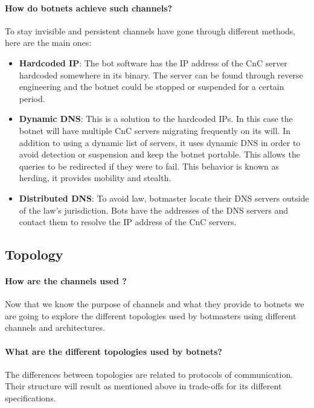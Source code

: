 \paragraph{How do botnets achieve such channels?}
To stay invisible and persistent channels have gone through different methods, here are the main ones: 
\begin{itemize}
\item \textbf{Hardcoded IP}: The bot software has the IP address of the CnC server hardcoded somewhere in its binary. The server can be found through reverse engineering and the botnet could be stopped or suspended for a certain period.
\item \textbf{Dynamic DNS}: This is a solution to the hardcoded IPs. In this case the botnet will have multiple CnC servers migrating frequently on its will. In addition to using a dynamic list of servers, it uses dynamic DNS in order to avoid detection or suspension and keep the botnet portable. This allows the queries to be redirected if they were to fail. This behavior is known as herding, it provides mobility and stealth.
\item \textbf{Distributed DNS}: To avoid law, botmaster locate their DNS servers outside of the law's jurisdiction. Bots have the addresses of the DNS servers and contact them to resolve the IP address of the CnC servers.
\end{itemize}

\subsection{Topology}
\paragraph{How are the channels used ?}
Now that we know the purpose of channels and what they provide to botnets we are going to explore the different topologies used by botmasters using different channels and architectures.
\paragraph{What are the different topologies used by botnets?}
The differences between topologies are related to protocols of communication. Their structure will result as mentioned above in trade-offs for its different specifications.

